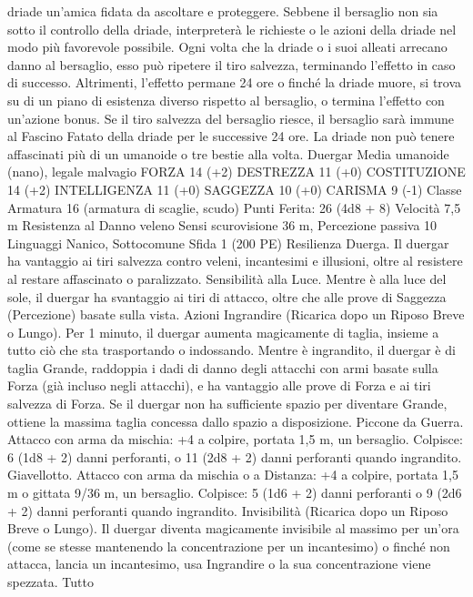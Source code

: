 \begin{multicols}{2}
driade un’amica fidata da ascoltare e proteggere. Sebbene il bersaglio
non sia sotto il controllo della driade, interpreterà le richieste o le
azioni della driade nel modo più favorevole possibile.
Ogni volta che la driade o i suoi alleati arrecano danno al bersaglio,
esso può ripetere il tiro salvezza, terminando l’effetto in caso di
successo. Altrimenti, l’effetto permane 24 ore o finché la driade
muore, si trova su di un piano di esistenza diverso rispetto al
bersaglio, o termina l’effetto con un’azione bonus. Se il tiro salvezza
del bersaglio riesce, il bersaglio sarà immune al Fascino Fatato della
driade per le successive 24 ore.
La driade non può tenere affascinati più di un umanoide o tre bestie
alla volta.
Duergar
Media umanoide (nano), legale malvagio
FORZA 14 (+2)
DESTREZZA 11 (+0)
COSTITUZIONE 14 (+2)
INTELLIGENZA 11 (+0)
SAGGEZZA 10 (+0)
CARISMA 9 (-1)
Classe Armatura 16 (armatura di scaglie, scudo)
\hspace*{0pt}\hfill{Punti Ferita}: 26 (4d8 + 8)
Velocità 7,5 m
Resistenza al Danno veleno
Sensi scurovisione 36 m, Percezione passiva 10
Linguaggi Nanico, Sottocomune
Sfida 1 (200 PE)
Resilienza Duerga. Il duergar ha vantaggio ai tiri salvezza contro
veleni, incantesimi e illusioni, oltre al resistere al restare
affascinato o paralizzato.
Sensibilità alla Luce. Mentre è alla luce del sole, il duergar ha
svantaggio ai tiri di attacco, oltre che alle prove di Saggezza
(Percezione) basate sulla vista.
Azioni
Ingrandire (Ricarica dopo un Riposo Breve o Lungo). Per 1
minuto, il duergar aumenta magicamente di taglia, insieme a
tutto ciò che sta trasportando o indossando. Mentre è ingrandito,
il duergar è di taglia Grande, raddoppia i dadi di danno degli
attacchi con armi basate sulla Forza (già incluso negli attacchi), e
ha vantaggio alle prove di Forza e ai tiri salvezza di Forza. Se il
duergar non ha sufficiente spazio per diventare Grande, ottiene la
massima taglia concessa dallo spazio a disposizione.
Piccone da Guerra. Attacco con arma da mischia: +4 a colpire,
portata 1,5 m, un bersaglio.
Colpisce: 6 (1d8 + 2) danni perforanti, o 11 (2d8 + 2) danni
perforanti quando ingrandito.
Giavellotto. Attacco con arma da mischia o a Distanza: +4 a
colpire, portata 1,5 m o gittata 9/36 m, un bersaglio.
Colpisce: 5 (1d6 + 2) danni perforanti o 9 (2d6 + 2) danni
perforanti quando ingrandito.
Invisibilità (Ricarica dopo un Riposo Breve o Lungo). Il
duergar diventa magicamente invisibile al massimo per un’ora
(come se stesse mantenendo la concentrazione per un
incantesimo) o finché non attacca, lancia un incantesimo, usa
Ingrandire o la sua concentrazione viene spezzata. Tutto

\end{multicols}

